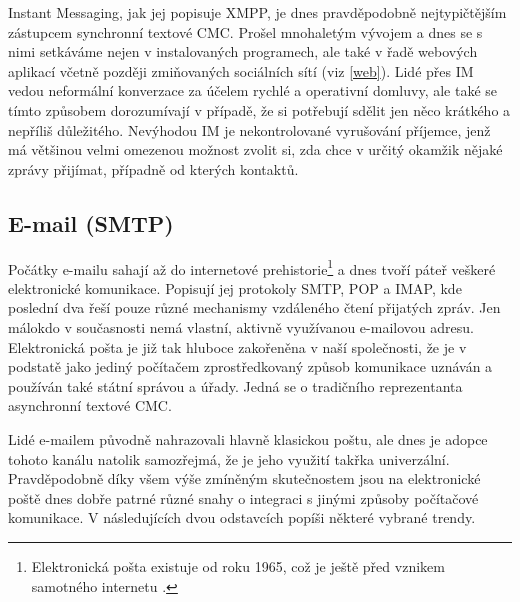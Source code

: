 \documentclass[12pt,oneside,final]{fithesis2}
\begin{document}
Instant Messaging, jak jej popisuje XMPP, je dnes pravděpodobně nejtypičtějším zástupcem synchronní textové CMC. Prošel mnohaletým vývojem a dnes se s nimi setkáváme nejen v instalovaných programech, ale také v řadě webových aplikací včetně později zmiňovaných sociálních sítí (viz \ref{web}). Lidé přes IM vedou neformální konverzace za účelem rychlé a operativní domluvy, ale také se tímto způsobem dorozumívají v případě, že si potřebují sdělit jen něco krátkého a nepříliš důležitého. Nevýhodou IM je nekontrolované vyrušování příjemce, jenž má většinou velmi omezenou možnost zvolit si, zda chce v určitý okamžik nějaké zprávy přijímat, případně od kterých kontaktů.

\subsection{E-mail (SMTP)}\label{email}
Počátky e-mailu sahají až do internetové prehistorie\footnote{Elektronická pošta existuje od roku 1965, což je ještě před vznikem samotného internetu \cite{vanvleck2012electronic}.} a dnes tvoří páteř veškeré elektronické komunikace. Popisují jej protokoly SMTP, POP a IMAP, kde poslední dva řeší pouze různé mechanismy vzdáleného čtení přijatých zpráv. Jen málokdo v současnosti nemá vlastní, aktivně využívanou e-mailovou adresu. Elektronická pošta je již tak hluboce zakořeněna v naší společnosti, že je v podstatě jako jediný počítačem zprostředkovaný způsob komunikace uznáván a používán také státní správou a úřady. Jedná se o tradičního reprezentanta asynchronní textové CMC.

Lidé e-mailem původně nahrazovali hlavně klasickou poštu, ale dnes je adopce tohoto kanálu natolik samozřejmá, že je jeho využití takřka univerzální. Pravděpodobně díky všem výše zmíněným skutečnostem jsou na elektronické poště dnes dobře patrné různé snahy o integraci s jinými způsoby počítačové komunikace. V následujících dvou odstavcích popíši některé vybrané trendy.
\end{document}
